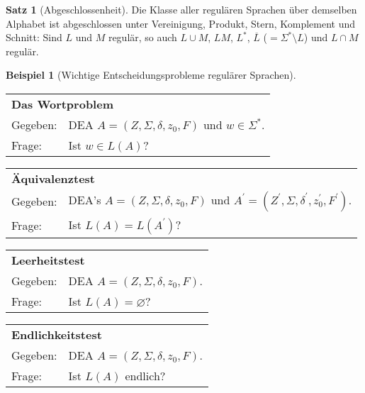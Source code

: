 \documentclass{scrreprt}
\theoremstyle{definition}
\newtheorem{Satz}{Satz}[section]
\theoremstyle{example}
\newtheorem{Beispiel}{Beispiel}[section]
\theoremstyle{algorithm}
\begin{document}
\begin{Satz}[Abgeschlossenheit]
Die Klasse aller regulären Sprachen über demselben Alphabet ist abgeschlossen unter Vereinigung, Produkt, Stern, Komplement und Schnitt: Sind $L$ und $M$ regulär, so auch $L \cup M$, $LM$, $L^*$, $\overline{L}$ ($= \Sigma^* \setminus L$) und $L \cap M$ regulär.
\end{Satz}

\begin{Beispiel}[Wichtige Entscheidungsprobleme regulärer Sprachen]
\begin{tabular}{ll}
\multicolumn{2}{l}{\textbf{Das Wortproblem}}\\
Gegeben:&DEA $A=(Z,\Sigma,\delta,z_0,F)$ und $w\in\Sigma^*$.\\
Frage:&Ist $w\in L(A)$?\\
\end{tabular}\newline
\begin{tabular}{ll}
\multicolumn{2}{l}{\textbf{Äquivalenztest}}\\
Gegeben:&DEA's $A=(Z,\Sigma,\delta,z_0,F)$ und $A^\prime=(Z^\prime,\Sigma,\delta^\prime,z_0^\prime,F^\prime)$.\\
Frage:&Ist $L(A) = L(A^\prime)$?\\
\end{tabular}\newline
\begin{tabular}{ll}
\multicolumn{2}{l}{\textbf{Leerheitstest}}\\
Gegeben:&DEA $A=(Z,\Sigma,\delta,z_0,F)$.\\
Frage:&Ist $L(A) = \varnothing$?\\
\end{tabular}\newline
\begin{tabular}{ll}
\multicolumn{2}{l}{\textbf{Endlichkeitstest}}\\
Gegeben:&DEA $A=(Z,\Sigma,\delta,z_0,F)$.\\
Frage:&Ist $L(A)$ endlich?\\
\end{tabular}
\end{Beispiel}
\end{document}
